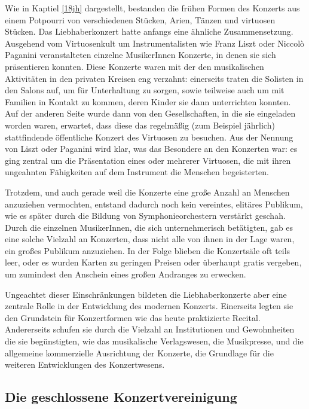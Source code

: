 \documentclass[a4paper, german, oneside]{scrbook}
\begin{document}
Wie in Kaptiel \ref{18jh} dargestellt, bestanden die frühen Formen des Konzerts aus einem Potpourri von verschiedenen Stücken, Arien, Tänzen und virtuosen Stücken. Das Liebhaberkonzert hatte anfangs eine ähnliche Zusammensetzung. Ausgehend vom Virtuosenkult um Instrumentalisten wie Franz Liszt oder Niccolò Paganini veranstalteten einzelne MusikerInnen Konzerte, in denen sie sich präsentieren konnten. Diese Konzerte waren mit der den musikalischen Aktivitäten in den privaten Kreisen eng verzahnt: einerseits traten die Solisten in den Salons auf, um für Unterhaltung zu sorgen, sowie teilweise auch um mit Familien in Kontakt zu kommen, deren Kinder sie dann unterrichten konnten. Auf der anderen Seite wurde dann von den Gesellschaften, in die sie eingeladen worden waren, erwartet, dass diese das regelmäßig (zum Beispiel jährlich) stattfindende öffentliche Konzert des Virtuosen zu besuchen. Aus der Nennung von Liszt oder Paganini wird klar, was das Besondere an den Konzerten war: es ging zentral um die Präsentation eines oder mehrerer Virtuosen, die mit ihren ungeahnten Fähigkeiten auf dem Instrument die Menschen begeisterten. \parencite[vgl.][24]{weber_music_2004}

Trotzdem, und auch gerade weil die Konzerte eine große Anzahl an Menschen anzuziehen vermochten, entstand dadurch noch kein vereintes, elitäres Publikum, wie es später durch die Bildung von Symphonieorchestern verstärkt geschah. Durch die einzelnen MusikerInnen, die sich unternehmerisch betätigten, gab es eine solche Vielzahl an Konzerten, dass nicht alle von ihnen in der Lage waren, ein großes Publikum anzuziehen. In der Folge blieben die Konzertsäle oft teils leer, oder es wurden Karten zu geringen Preisen oder überhaupt gratis vergeben, um zumindest den Anschein eines großen Andranges zu erwecken. \parencite[vgl.][49ff.]{weber_music_2004}

Ungeachtet dieser Einschränkungen bildeten die Liebhaberkonzerte aber eine zentrale Rolle in der Entwicklung des modernen Konzerts. Einerseits legten sie den Grundstein für Konzertformen wie das heute praktizierte Recital. Andererseits schufen sie durch die Vielzahl an Institutionen und Gewohnheiten die sie begünstigten, wie das musikalische Verlagswesen, die Musikpresse, und die allgemeine kommerzielle Ausrichtung der Konzerte, die Grundlage für die weiteren Entwicklungen des Konzertwesens.

\subsection{Die geschlossene Konzertvereinigung}
\label{konzertvereinigung}
\end{document}
